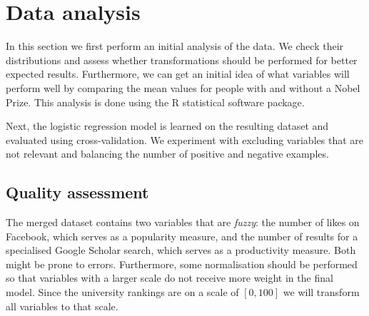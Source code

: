 \section{Data analysis}
\label{sec:analysis}

In this section we first perform an initial analysis of the data. We check their distributions and assess whether transformations should be performed for better expected results. Furthermore, we can get an initial idea of what variables will perform well by comparing the mean values for people with and without a Nobel Prize. This analysis is done using the R statistical software package.

Next, the logistic regression model is learned on the resulting dataset and evaluated using cross-validation. We experiment with excluding variables that are not relevant and balancing the number of positive and negative examples.

\subsection{Quality assessment}
\label{ssec:quality}

The merged dataset contains two variables that are \emph{fuzzy}: the number of likes on Facebook, which serves as a popularity measure, and the number of results for a specialised Google Scholar search, which serves as a productivity measure. Both might be prone to errors. Furthermore, some normalisation should be performed so that variables with a larger scale do not receive more weight in the final model. Since the university rankings are on a scale of $[0, 100]$ we will transform all variables to that scale.

